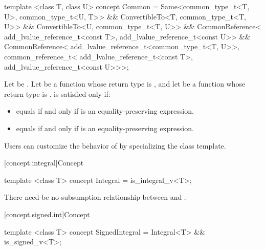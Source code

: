 %
\begin{itemdecl}
template <class T, class U>
concept Common =
  Same<common_type_t<T, U>, common_type_t<U, T>> &&
  ConvertibleTo<T, common_type_t<T, U>> &&
  ConvertibleTo<U, common_type_t<T, U>> &&
  CommonReference<
    add_lvalue_reference_t<const T>,
    add_lvalue_reference_t<const U>> &&
  CommonReference<
    add_lvalue_reference_t<common_type_t<T, U>>,
    common_reference_t<
      add_lvalue_reference_t<const T>,
      add_lvalue_reference_t<const U>>>;
\end{itemdecl}

\begin{itemdescr}
\pnum
Let  be . Let
 be a function whose return type is , and let  be a
function whose return type is .  is
satisfied only if:
\begin{itemize}
\item {} equals  if and only if
   is an equality-preserving
  expression.
\item {} equals  if and only if
   is an equality-preserving
  expression.
\end{itemize}

\pnum
\begin{note}
Users can customize the behavior of  by specializing the
 class template.
\end{note}

\end{itemdescr}

[concept.integral]{Concept }

%
\begin{itemdecl}
template <class T>
concept Integral = is_integral_v<T>;
\end{itemdecl}

\begin{itemdescr}
\pnum
There need be no subsumption relationship between
and
.
\end{itemdescr}

[concept.signed.int]{Concept }

%
\begin{itemdecl}
template <class T>
concept SignedIntegral = Integral<T> && is_signed_v<T>;
\end{itemdecl}

